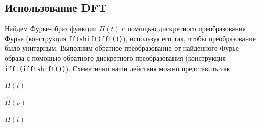 \documentclass[a4paper, 12pt]{article}
\begin{document}
    \subsection{Использование DFT}
    Найдем Фурье-образ функции $\Pi(t)$ с помощью дискретного преобразования Фурье (конструкция \texttt{fftshift(fft())}), используя его так,
    чтобы преобразование было унитарным. Выполним обратное преобразование от
    найденного Фурье-образа с помощью обратного дискретного преобразования (конструкция \texttt{ifft(ifftshift())}). Схематично наши действия можно представить так:
    \begin{center}
        $\Pi(t)$
        $\hat{\Pi}(\nu)$
        $\Pi(t)$
    \end{center}
\end{document}
